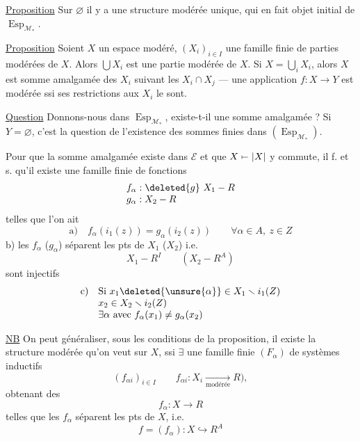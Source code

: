 \uline{Proposition} Sur $\varnothing$ il y a une structure modérée unique, qui en fait objet initial de $\operatorname{Esp}_{\mathcal M_*}$.

\uline{Proposition} Soient $X$ un espace modéré, $(X_i)_{i\in I}$ une famille finie de parties modérées de $X$. Alors $\bigcup X_i$ est une partie modérée de $X$. Si $X=\bigcup_iX_i$, alors $X$ est somme amalgamée des $X_i$ suivant les $X_i\cap X_j$ --- une application $f:X\longrightarrow Y$  est modérée ssi ses restrictions aux $X_i$ le sont.

\uline{Question} Donnons-nous
dans $\operatorname{Esp}_{\mathcal M_*}$, existe-t-il une somme amalgamée ? Si $Y=\varnothing$, c'est la question de l'existence des sommes finies dans $(\operatorname{Esp}_{\mathcal M_*})$.

Pour que la somme amalgamée existe dans  $\mathcal E$ et que $X\mathrel{\mapstochar\relbar}|X|$ y commute, il f. et s. qu'il existe une famille finie de  fonctions
\[
\begin{array}{l}
f_\alpha:\deleted{g}\ X_1\mathbin{-}R\\
g_\alpha:X_2\mathbin{-}R
\end{array}
\]
telles que l'on ait
\[
\text{a)}\quad f_\alpha(i_1(z))=g_\alpha(i_2(z))\qquad\forall\alpha\in A,\ z\in Z
\]
b)  les $f_\alpha$ ($g_\alpha$) séparent les pts de $X_1$ ($X_2$) i.e.
\[
 X_1\mathbin{-}R^I\qquad(X_2\mathbin{-}R^A)
\]
sont injectifs
\[
\begin{array}{ll}
\text{c)}&\text{Si }x_1\deleted{\unsure{\alpha}}\in X_1\smallsetminus i_1(Z)\\
&x_2\in X_2\smallsetminus i_2(Z)\\
&\exists\alpha\text{ avec }f_\alpha(x_1)\ne g_\alpha(x_2)
\end{array}
\]

\uline{NB} On peut généraliser, sous les conditions de la proposition, il existe la structure modérée qu'on veut sur $X$, ssi $\exists$ une famille finie $(F_\alpha)$  de systèmes inductifs
\[
 (f_{\alpha i})_{i\in I}\qquad f_{\alpha i}:X_i\underset{\text{modérée}}{\longrightarrow}R),
\]
obtenant des
\[
 f_\alpha:X\longrightarrow R
\]
telles que les $f_\alpha$ séparent les pts de $X$, i.e.
\[
 f=(f_\alpha):X\hookrightarrow R^A
\]

